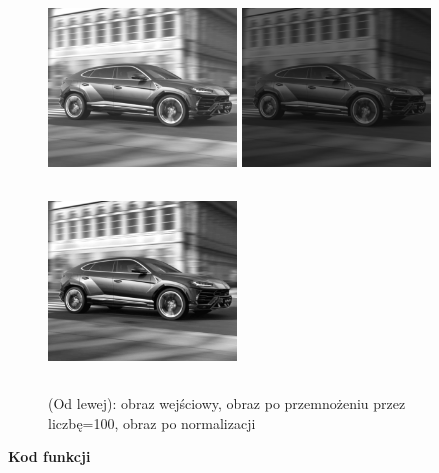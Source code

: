 \documentclass[magisterska,openany]{pracadypl}
\begin{document}
\begin{figure}[h]
\centering
\includegraphics[width=5cm, height=5cm]{orgi/gLU.jpg}
\includegraphics[width=5cm, height=5cm]{3_3/multi_constG2.jpg}
\includegraphics[width=5cm, height=5cm]{3_3/nmulti_constG2.jpg}
\caption{(Od lewej): obraz wejściowy, obraz po przemnożeniu przez liczbę=100, obraz po normalizacji}
\end{figure}

\newpage
\textbf{\Large Kod funkcji}
   
\end{document}
